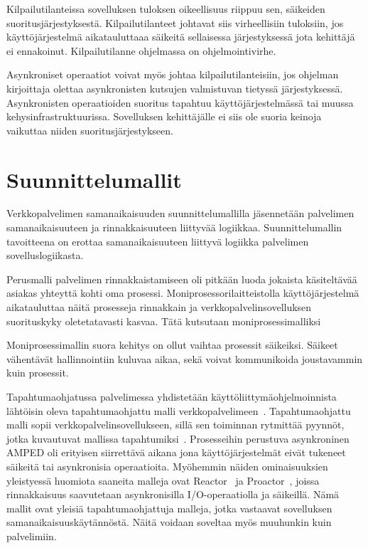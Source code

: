 \documentclass[finnish]{tktltiki2}
\theoremstyle{definition}
\theoremstyle{remark}
\begin{document}
Kilpailutilanteissa sovelluksen tuloksen oikeellisuus riippuu sen,
säikeiden suoritusjärjestyksestä. Kilpailutilanteet johtavat siis
virheellisiin tuloksiin, jos käyttöjärjestelmä aikatauluttaaa
säikeitä sellaisessa järjestyksessä jota kehittäjä ei ennakoinut.
Kilpailutilanne ohjelmassa on ohjelmointivirhe.

Asynkroniset operaatiot voivat myös johtaa kilpailutilanteisiin,
jos ohjelman kirjoittaja olettaa asynkronisten kutsujen
valmistuvan tietyssä järjestyksessä. Asynkronisten operaatioiden
suoritus tapahtuu käyttöjärjestelmässä tai muussa kehysinfrastruktuurissa.
Sovelluksen kehittäjälle ei siis ole suoria keinoja vaikuttaa
niiden suoritusjärjestykseen.

\section{Suunnittelumallit}\label{sec:SM}

Verkkopalvelimen samanaikaisuuden suunnittelumallilla
jäsennetään palvelimen samanaikaisuuteen ja rinnakkaisuuteen
liittyvää logiikkaa. Suunnittelumallin tavoitteena on
erottaa samanaikaisuuteen liittyvä logiikka 
palvelimen sovelluslogiikasta.


Perusmalli palvelimen rinnakkaistamiseen oli pitkään
luoda jokaista käsiteltävää asiakas yhteyttä kohti
oma prosessi. Moniprosessorilaitteistolla käyttöjärjestelmä
aikatauluttaa näitä prosesseja rinnakkain ja verkkopalvelinsovelluksen
suorituskyky oletetatavasti kasvaa. Tätä kutsutaan moniprosessimalliksi

Moniprosessimallin suora kehitys on ollut vaihtaa prosessit säikeiksi.
Säikeet vähentävät hallinnointiin kuluvaa aikaa, sekä
voivat kommunikoida joustavammin kuin prosessit.

Tapahtumaohjatussa palvelimessa yhdistetään
käyttöliittymäohjelmoinnista lähtöisin oleva tapahtumaohjattu malli
verkkopalvelimeen~\cite{pai_flash:_1999}. Tapahtumaohjattu malli sopii verkkopalvelinsovellukseen,
sillä sen toiminnan rytmittää pyynnöt, jotka
kuvautuvat mallissa tapahtumiksi~\cite{schmidt_reactor:_1995}.
Prosesseihin perustuva asynkroninen AMPED\cite{pai_flash:_1999}
oli erityisen siirrettävä aikana jona käyttöjärjestelmät
eivät tukeneet säikeitä tai asynkronisia operaatioita.
Myöhemmin näiden ominaisuuksien yleistyessä
huomiota saaneita malleja ovat Reactor~\cite{schmidt_reactor:_1995}
ja Proactor~\cite{pyarali_proactor_1997}, joissa
rinnakkaisuus saavutetaan asynkronisilla I/O-operaatiolla
ja säikeillä. Nämä mallit ovat yleisiä tapahtumaohjattuja malleja, jotka
vastaavat sovelluksen samanaikaisuuskäytännöstä.
Näitä voidaan soveltaa myös muuhunkin kuin palvelimiin.
\end{document}
